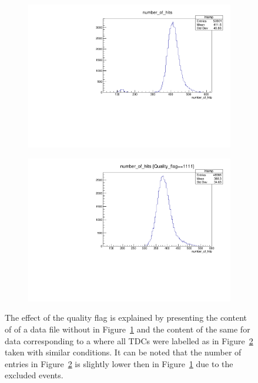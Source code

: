 	\begin{figure}[H]
        \begin{subfigure}{0.5\linewidth}
		    \centering
			\includegraphics[width = \linewidth]{fig/app1/No_Qflag_nhits_DAQ.pdf}
			\caption{\label{fig:qflag-daq:A}}
		\end{subfigure}
		\begin{subfigure}{0.5\linewidth}
		    \centering
			\includegraphics[width = \linewidth]{fig/app1/With_Qflag_nhits_DAQ.pdf}
			\caption{\label{fig:qflag-daq:B}}
		\end{subfigure}
		\caption{\label{fig:qflag-daq} The effect of the quality flag is explained by presenting the content of  of a data file without  in Figure~\ref{fig:qflag-daq:A} and the content of the same  for data corresponding to a  where all TDCs were labelled as  in Figure~\ref{fig:qflag-daq:B} taken with similar conditions. It can be noted that the number of entries in Figure~\ref{fig:qflag-daq:B} is slightly lower then in Figure~\ref{fig:qflag-daq:A} due to the excluded events.}
	\end{figure}
	
